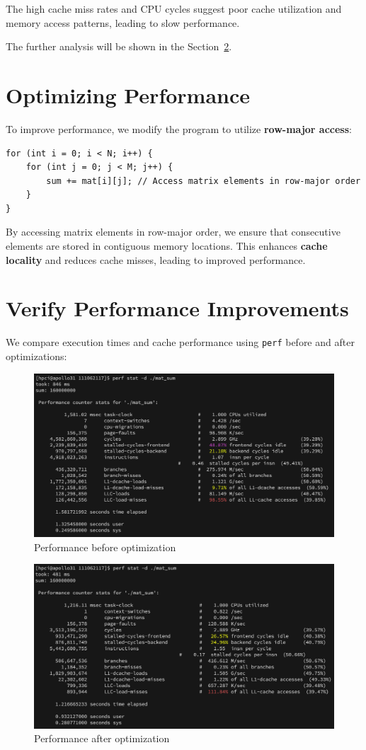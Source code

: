 \documentclass{article}
\begin{document}
The high cache miss rates and CPU cycles suggest poor cache utilization and memory access patterns, leading to slow performance.

The further analysis will be shown in the Section~\ref{sec:verify}.

\section{Optimizing Performance}
To improve performance, we modify the program to utilize \textbf{row-major access}:

\begin{lstlisting}
for (int i = 0; i < N; i++) {
    for (int j = 0; j < M; j++) {
        sum += mat[i][j]; // Access matrix elements in row-major order
    }
}
\end{lstlisting}

By accessing matrix elements in row-major order, we ensure that consecutive elements are stored in contiguous memory locations. This enhances \textbf{cache locality} and reduces cache misses, leading to improved performance.

\section{Verify Performance Improvements}
\label{sec:verify}

We compare execution times and cache performance using \texttt{perf} before and after optimizations:

\begin{figure}[h]
    \centering
    \includegraphics[width=0.7\linewidth]{./img/img-1.png}
    \caption{Performance before optimization}
\end{figure}

\begin{figure}[h]
    \centering
    \includegraphics[width=0.7\linewidth]{./img/img-2.png}
    \caption{Performance after optimization}
\end{figure}
\end{document}
